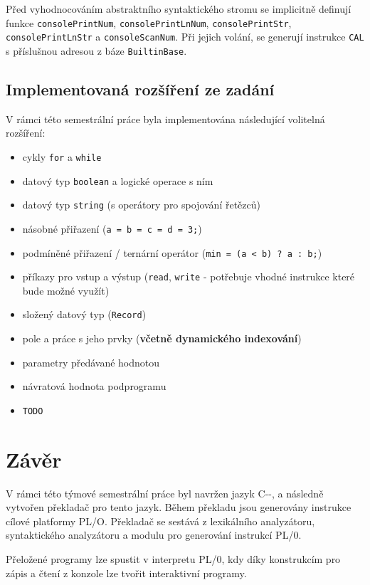 \documentclass[12pt, a4paper]{article}
\let\oldsection\section
\renewcommand\section{\clearpage\oldsection}
\begin{document}
Před vyhodnocováním abstraktního syntaktického stromu se implicitně definují funkce \texttt{consolePrintNum}, \texttt{consolePrintLnNum}, \texttt{consolePrintStr}, \texttt{consolePrintLnStr} a \texttt{consoleScanNum}. Při jejich volání, se generují instrukce \texttt{CAL} s příslušnou adresou z báze \texttt{BuiltinBase}.


\subsection{Implementovaná rozšíření ze zadání}
V rámci této semestrální práce byla implementována následující volitelná rozšíření:

\begin{itemize}
    \item cykly \texttt{for} a \texttt{while}
    \item datový typ \texttt{boolean} a logické operace s ním
    \item datový typ \texttt{string} (s operátory pro spojování řetězců)
    \item násobné přiřazení (\texttt{a = b = c = d = 3;})
    \item podmíněné přiřazení / ternární operátor (\texttt{min = (a < b) ? a : b;})
    \item příkazy pro vstup a výstup (\texttt{read}, \texttt{write} - potřebuje vhodné instrukce které bude možné využít)
    \item složený datový typ (\texttt{Record})
    \item pole a práce s jeho prvky (\textbf{včetně dynamického indexování})
    \item parametry předávané hodnotou
    \item návratová hodnota podprogramu
    \item \begin{huge}\texttt{TODO}\end{huge}
\end{itemize}


\section{Závěr}	
V rámci této týmové semestrální práce byl navržen jazyk C-{}-, a následně vytvořen překladač pro tento jazyk. Během překladu jsou generovány instrukce cílové platformy PL/O. Překladač se sestává z lexikálního analyzátoru, syntaktického analyzátoru a modulu pro generování instrukcí PL/0.

Přeložené programy lze spustit v interpretu PL/0, kdy díky konstrukcím pro zápis a čtení z konzole lze tvořit interaktivní programy.
\end{document}
